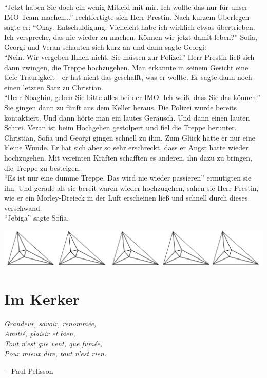 \documentclass[oneside]{memoir}
\makeatletter
\newcommand{\parasep}{
\bigskip
\bigskip
\begin{center} 
   \includegraphics[scale=.08]{parasep5.jpg} 
\end{center}
\bigskip
\bigskip
}
\newenvironment{chapquote}[2][2em]
  {\setlength{\@tempdima}{#1}%
   \def\chapquote@author{#2}%
   \parshape 1 \@tempdima \dimexpr\textwidth-2\@tempdima\relax%
   \itshape}
  {\par\normalfont\hfill--\ \chapquote@author\hspace*{\@tempdima}\par\bigskip}
\makeatother
\begin{document}
“Jetzt haben Sie doch ein wenig Mitleid mit mir. Ich wollte das nur für unser IMO-Team machen...” rechtfertigte sich Herr Prestin. Nach kurzem Überlegen sagte er: “Okay. Entschuldigung. Vielleicht habe ich wirklich etwas übertrieben. Ich verspreche, das nie wieder zu machen. Können wir jetzt damit leben?” 
Sofia, Georgi und Veran schauten sich kurz an und dann sagte Georgi: \\
“Nein. Wir vergeben Ihnen nicht. Sie müssen zur Polizei.”
Herr Prestin ließ sich dann zwingen, die Treppe hochzugehen. Man erkannte in seinem Gesicht eine tiefe Traurigkeit - er hat nicht das geschafft, was er wollte. Er sagte dann noch einen letzten Satz zu Christian. \\
“Herr Noaghiu, geben Sie bitte alles bei der IMO. Ich weiß, dass Sie das können.”
Sie gingen dann zu fünft aus dem Keller heraus. Die Polizei wurde bereits kontaktiert. 
Und dann hörte man ein lautes Geräusch. Und dann einen lauten Schrei. Veran ist beim Hochgehen gestolpert und fiel die Treppe herunter. Christian, Sofia und Georgi gingen schnell zu ihm. Zum Glück hatte er nur eine kleine Wunde. Er hat sich aber so sehr erschreckt, dass er Angst hatte wieder hochzugehen. Mit vereinten Kräften schafften es anderen, ihn dazu zu bringen, die Treppe zu besteigen. \\
“Es ist nur eine dumme Treppe. Das wird nie wieder passieren” ermutigten sie ihn.
Und gerade als sie bereit waren wieder hochzugehen, sahen sie Herr Prestin, wie er ein Morley-Dreieck in der Luft erscheinen ließ und schnell durch dieses verschwand.  \\

“Jebiga” sagte Sofia.


\parasep
     
     
\chapter{Im Kerker} %
\begin{chapquote}{Paul Pelisson}
\glqq Grandeur, savoir, renommée, \\
Amitié, plaisir et bien, \\
Tout n’est que vent, que fumée, \\
Pour mieux dire, tout n’est rien. 
\grqq
\end{chapquote}
\end{document}
